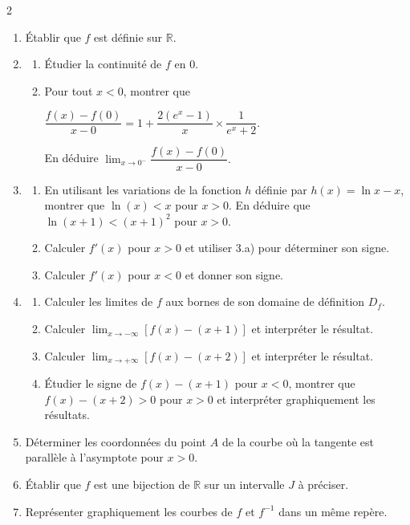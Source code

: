 \documentclass[12pt,a4paper]{article}
\begin{document}
\begin{multicols}{2}
\begin{enumerate}
\item Établir que $f$ est définie sur $\mathbb{R}$.

\item 
\begin{enumerate}
\item Étudier la continuité de $f$ en $0$.
\item Pour tout $x<0$, montrer que  

\( \dfrac{f(x)-f(0)}{x-0}
=1+\dfrac{2(e^x-1)}{x}\times\dfrac{1}{e^x+2}. \)  

En déduire  
\( \lim_{x\to 0^-}\dfrac{f(x)-f(0)}{x-0}. \)
\end{enumerate}

\item 
\begin{enumerate}
\item En utilisant les variations de la fonction $h$ définie par \( h(x)=\ln x - x \), montrer que \( \ln(x)<x \) pour $x>0$.  
En déduire que \( \ln(x+1)<(x+1)^2 \) pour $x>0$.
\item Calculer $f'(x)$ pour $x>0$ et utiliser 3.a) pour déterminer son signe.
\item Calculer $f'(x)$ pour $x<0$ et donner son signe.
\end{enumerate}

\item 
\begin{enumerate}
\item Calculer les limites de $f$ aux bornes de son domaine de définition $D_f$.
\item Calculer \( \lim_{x\to -\infty}[f(x)-(x+1)] \) et interpréter le résultat.
\item Calculer \( \lim_{x\to +\infty}[f(x)-(x+2)] \) et interpréter le résultat.
\item Étudier le signe de $f(x)-(x+1)$ pour $x<0$, montrer que $f(x)-(x+2)>0$ pour $x>0$ et interpréter graphiquement les résultats.
\end{enumerate}

\item Déterminer les coordonnées du point $A$ de la courbe où la tangente est parallèle à l’asymptote pour $x>0$.

\item Établir que $f$ est une bijection de $\mathbb{R}$ sur un intervalle $J$ à préciser.

\item Représenter graphiquement les courbes de $f$ et $f^{-1}$ dans un même repère.


\end{enumerate}
\end{multicols}
\end{document}
